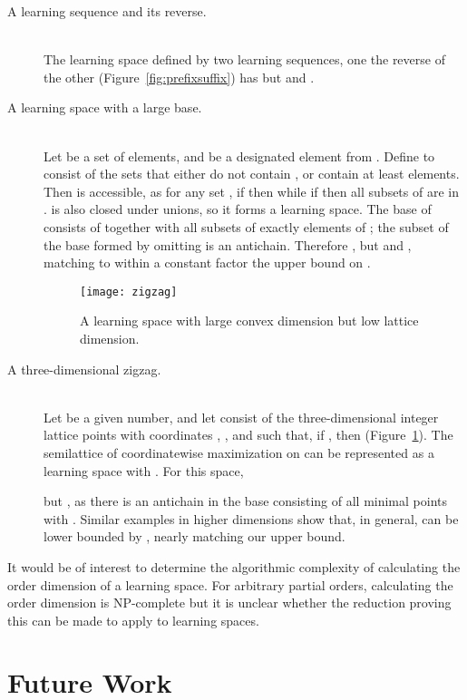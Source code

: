 \documentclass[11pt]{llncs}
\begin{document}
{\begin{description}
\item[A learning sequence and its reverse.] \hfill\\
The learning space defined by two learning sequences, one the reverse of the other
(Figure~\ref{fig:prefixsuffix}) has
 but
 and .

\item[A learning space with a large base.] \hfill\\
Let  be a set of  elements, and  be a designated element from .
Define  to consist of the sets that either do not contain , or
contain at least  elements.
Then  is accessible, as for any set , if  then 
while if  then all subsets of  are in .
 is also closed under unions, so it forms  a learning space.
The base of  consists of  together with all subsets of exactly
 elements of ; the subset of the base formed by omitting  is an antichain.
Therefore ,
but  and
, matching to within a constant factor the  upper bound on .

\begin{figure}[t]
\centering\texttt{[image: zigzag]}
\caption{A learning space with large convex dimension but low lattice dimension.}
\label{fig:zigzag}
\end{figure}

\item[A three-dimensional zigzag.] \hfill\\
Let  be a given number, and let  consist of the three-dimensional integer lattice points with coordinates , , and such that, if , then  (Figure~\ref{fig:zigzag}).
The semilattice of coordinatewise maximization on  can be represented as a learning space  with . For this space,

but , as there is an antichain in the base consisting of all minimal points with . Similar examples in higher dimensions show that, in general,  can be lower bounded by ,
nearly matching our  upper bound.
\end{description}

It would be of interest to determine the algorithmic complexity of calculating the order dimension of a learning space. For arbitrary partial orders, calculating the order dimension is NP-complete \citep{Yan-SIADM-82} but it is unclear whether the reduction proving this can be made to apply to learning spaces.

\section{Future Work}

}
\end{document}
